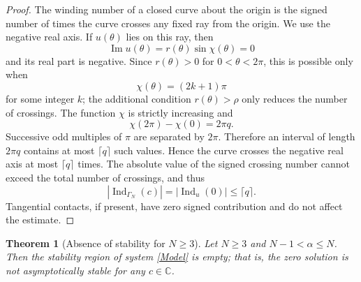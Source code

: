\documentclass[11pt,a4paper]{article}
\newtheorem{thm}{Theorem}[section]
\theoremstyle{definition}
\begin{document}
\begin{proof}
The winding number of a closed curve about the origin is the signed number
of times the curve crosses any fixed ray from the origin. We use the
negative real axis. If $u(\theta)$ lies on this ray, then
\begin{equation*}
\operatorname{Im}u(\theta)=r(\theta)\sin\chi(\theta)=0
\end{equation*}
and its real part is negative. Since $r(\theta)>0$ for
$0<\theta<2\pi$, this is possible only when
\begin{equation*}
\chi(\theta)=(2k+1)\pi
\end{equation*}
for some integer $k$; the additional condition $r(\theta)>\rho$ only
reduces the number of crossings. The function $\chi$ is strictly
increasing and
\begin{equation*}
\chi(2\pi)-\chi(0)=2\pi q.
\end{equation*}
Successive odd multiples of $\pi$ are separated by $2\pi$. Therefore an
interval of length $2\pi q$ contains at most $\lceil q\rceil$ such
values. Hence the curve crosses the negative real axis at most
$\lceil q\rceil$ times. The absolute value of the signed crossing number
cannot exceed the total number of crossings, and thus
\begin{equation*}
\left|\operatorname{Ind}_{\Gamma_N}(c)\right|
=\left|\operatorname{Ind}_{u}(0)\right|
\leq\lceil q\rceil.
\end{equation*}
Tangential contacts, if present, have zero signed contribution and do not
affect the estimate.
\end{proof}

\begin{thm}[Absence of stability for $N\geq3$]\label{thm:no-stability}
Let $N\geq3$ and $N-1<\alpha\leq N$. Then the stability region of system \eqref{Model} is empty; that is, the zero solution is not asymptotically stable for any $c\in\mathbb{C}$.
\end{thm}
\end{document}
